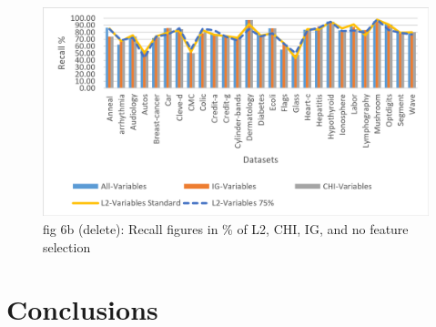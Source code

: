 \documentclass[review]{elsarticle}
\begin{document}
\begin{figure}[h]
	\centering
	\includegraphics[width=0.8\linewidth]{figs/fig_6b_recall_75.png}
	\caption[fig-6b-recall-75]{ fig 6b (delete): Recall figures in \% of L2, CHI, IG, and no feature selection  }
	\label{fig:fig-6b-recall-75}
\end{figure}


\section{Conclusions }
\end{document}
